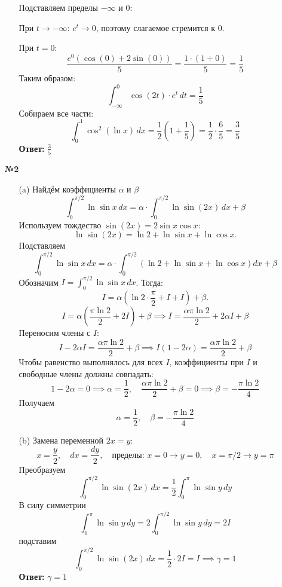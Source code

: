 \documentclass[a4paper]{article}
\renewcommand{\f}[2]{\frac{#1}{#2}}
\begin{document}
\begin{enumerate}
\begin{enumerate}
    Подставляем пределы \(-\infty\) и \(0\):  
    
    При \(t \to -\infty\): \(e^t \to 0\), поэтому слагаемое стремится к 0.  
    
    При \(t = 0\):  
    \[
    \dfrac{e^0 \left(\cos(0) + 2\sin(0)\right)}{5} = \dfrac{1 \cdot (1 + 0)}{5}
     = \dfrac{1}{5}
    \]  
    Таким образом:  
    \[
    \int_{-\infty}^{0} \cos(2t) \cdot e^t \, dt = \dfrac{1}{5}
    \]
    Собираем все части:  
    \[
    \int_{0}^{1} \cos^2(\ln x) \, dx = \dfrac{1}{2} \left(1 + \dfrac{1}{5}\right)
     = \dfrac{1}{2} \cdot \dfrac{6}{5} = \dfrac{3}{5}
    \]
    \textbf{Ответ: } $\f{3}{5}$\\
  \end{enumerate}

  \item[\textbf{№2}]\begin{enumerate}
    \item[(a)]Найдём коэффициенты \( \alpha \) и \( \beta \)
    \[
    \int_{0}^{\pi/2} \ln \sin x \, dx = \alpha \cdot \int_{0}^{\pi/2} \ln 
    \sin(2x) \, dx + \beta
    \]
    Используем тождество \(\sin(2x) = 2 \sin x \cos x\):
    \[
    \ln \sin(2x) = \ln 2 + \ln \sin x + \ln \cos x.
    \]
    Подставляем
    \[
    \int_{0}^{\pi/2} \ln \sin x \, dx = \alpha \cdot \int_{0}^{\pi/2}
     \left(\ln 2 + \ln \sin x + \ln \cos x\right) dx + \beta
    \]
    Обозначим \( I = \int_{0}^{\pi/2} \ln \sin x \, dx \). Тогда:  
    \[
    I = \alpha \left(\ln 2 \cdot \dfrac{\pi}{2} + I + I\right) + \beta.
    \]
    \[
    I = \alpha \left(\dfrac{\pi \ln 2}{2} + 2I\right) + \beta \implies 
    I = \dfrac{\alpha \pi \ln 2}{2} + 2\alpha I + \beta
    \]  
    Переносим члены с \(I\):  
    \[
    I - 2\alpha I = \dfrac{\alpha \pi \ln 2}{2} + \beta 
    \implies I(1 - 2\alpha) = \dfrac{\alpha \pi \ln 2}{2} + \beta
    \]  
    Чтобы равенство выполнялось для всех \(I\), коэффициенты при \(I\) и 
    свободные члены должны совпадать:  
    \[
    1 - 2\alpha = 0 \implies \alpha = \dfrac{1}{2}, \quad 
    \dfrac{\alpha \pi \ln 2}{2} + \beta = 0 \implies \beta = -\dfrac{\pi \ln 2}{4}
    \]
    Получаем
    \[
    \alpha = \dfrac{1}{2}, \quad \beta = -\dfrac{\pi \ln 2}{4}
    \]

    \item[(b)]Замена переменной \(2x = y\):
    \[
    x = \dfrac{y}{2}, \quad dx = \dfrac{dy}{2}, \quad \text{пределы: }
     x=0 \to y=0, \quad x=\pi/2 \to y=\pi
    \]
    Преобразуем
    \[
    \int_{0}^{\pi/2} \ln \sin(2x) \, dx = \dfrac{1}{2} \int_{0}^{\pi} \ln \sin y \, dy
    \]
    В силу симметрии
    \[
    \int_{0}^{\pi} \ln \sin y \, dy = 2 \int_{0}^{\pi/2} \ln \sin y \, dy = 2I
    \]
    подставим
    \[
    \int_{0}^{\pi/2} \ln \sin(2x) \, dx = \dfrac{1}{2} \cdot 2I = I \implies \gamma = 1
    \]
    \textbf{Ответ: }$\gamma = 1$


\end{enumerate}
\end{enumerate}
\end{document}
